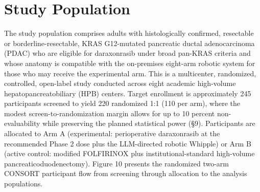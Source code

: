 \section{Study Population}

The study population comprises adults with histologically confirmed, resectable or
borderline-resectable, KRAS G12-mutated pancreatic ductal adenocarcinoma (PDAC)
who are eligible for daraxonrasib under broad pan-KRAS criteria and whose anatomy
is compatible with the on-premises eight-arm robotic system for those who may
receive the experimental arm. This is a multicenter, randomized, controlled,
open-label study conducted across eight academic high-volume hepatopancreatobiliary
(HPB) centers. Target enrollment is approximately 245 participants screened to
yield 220 randomized 1:1 (110 per arm), where the modest screen-to-randomization
margin allows for up to 10 percent non-evaluability while preserving the planned
statistical power (\S9). Participants are allocated to Arm A (experimental:
perioperative daraxonrasib at the recommended Phase 2 dose plus the LLM-directed
robotic Whipple) or Arm B (active control: modified FOLFIRINOX \cite{Conroy2018}
plus institutional-standard high-volume pancreaticoduodenectomy). Figure 10
presents the randomized two-arm CONSORT participant flow from screening through
allocation to the analysis populations.

